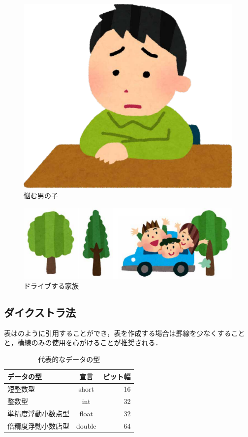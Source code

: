 \documentclass[a4paper,10pt,twocolumn,uplatex]{jsarticle}
\begin{document}
\begin{figure}[!tb]
  \centering
  \includegraphics[width=\linewidth]{img/sample1.pdf}
  \caption{悩む男の子}
  \label{fig:sample1}
\end{figure}

\begin{figure}[!tb]
  \centering
  \includegraphics[width=\linewidth]{img/sample2.pdf}
  \caption{ドライブする家族}
  \label{fig:sample2}
\end{figure}

\subsection{ダイクストラ法}
表はのように引用することができ，表を作成する場合は罫線を少なくすることと，横線のみの使用を心がけることが推奨される．

\begin{table}[!bt]
  \caption{代表的なデータの型}
  \label{tab:data_type}
  \centering
  \begin{tabular}{lcr}
    \hline
    データの型         & 宣言   & ビット幅 \\
    \hline \hline
    短整数型           & short  & 16       \\
    整数型             & int    & 32       \\
    単精度浮動小数点型 & float  & 32       \\
    倍精度浮動小数店型 & double & 64       \\
    \hline
  \end{tabular}
\end{table}
\end{document}
